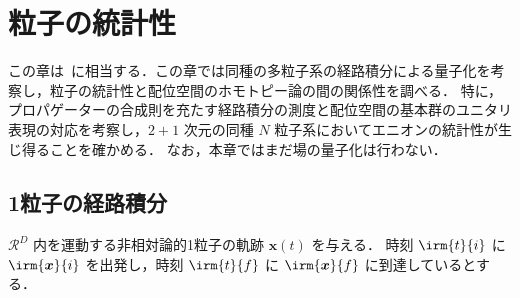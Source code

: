 \documentclass[TQFT_main]{subfiles}
\begin{document}

\chapter{粒子の統計性}

この章は~\cite[Chapter3, 4]{Simon2021}に相当する．この章では同種の多粒子系の経路積分による量子化を考察し，粒子の統計性と配位空間のホモトピー論の間の関係性を調べる．
特に，プロパゲーターの合成則を充たす経路積分の測度と配位空間の基本群のユニタリ表現の対応を考察し，$2+1$ 次元の同種 $N$ 粒子系においてエニオンの統計性が生じ得ることを確かめる．
なお，本章ではまだ場の量子化は行わない．

\section{1粒子の経路積分}

$\mathcal{R}^D$ 内を運動する非相対論的1粒子の軌跡 $\bm{x}(t)$ を与える．
時刻 $\irm{t}{i}$ に $\irm{\bm{x}}{i}$ を出発し，時刻 $\irm{t}{f}$ に $\irm{\bm{x}}{f}$ に到達しているとする．
\end{document}
